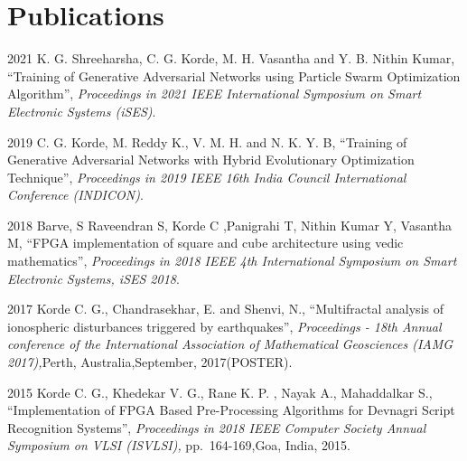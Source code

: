 \documentclass[fontsize=11pt]{tccv}
\begin{document}
\section{Publications}

\begin{publi}
\item{2021} {K. G. Shreeharsha, C. G. Korde, M. H. Vasantha and Y. B. Nithin Kumar, \textquotedblleft Training of Generative Adversarial Networks using Particle Swarm Optimization Algorithm\textquotedblright, \textit{Proceedings in 2021 IEEE International Symposium on Smart Electronic Systems (iSES)}.\qquad }
\vspace{1em}

\item{2019} {C. G. Korde, M. Reddy K., V. M. H. and N. K. Y. B, \textquotedblleft Training of Generative Adversarial Networks with Hybrid Evolutionary Optimization Technique\textquotedblright, \textit{Proceedings in 2019 IEEE 16th India Council International Conference (INDICON)}.\qquad }
\item{2018} {Barve, S Raveendran S, Korde C ,Panigrahi T, Nithin Kumar Y, Vasantha M,  \textquotedblleft FPGA implementation of square and cube architecture using vedic mathematics\textquotedblright, \textit{Proceedings in 2018 IEEE 4th International Symposium on Smart Electronic Systems, iSES 2018}.\qquad }
\vspace{1em}

\item{2017} {  Korde C. G., Chandrasekhar, E. and Shenvi, N., \textquotedblleft Multifractal analysis of ionospheric disturbances triggered by earthquakes\textquotedblright, \textit{Proceedings - 18th Annual conference of the International Association of Mathematical Geosciences (IAMG 2017),}Perth, Australia,September, 2017(POSTER).\qquad }
\vspace{1em}

\item{2015} {Korde C. G., Khedekar V. G., Rane K. P. , Nayak A., Mahaddalkar S., \textquotedblleft Implementation of FPGA Based Pre-Processing Algorithms for Devnagri Script Recognition Systems\textquotedblright, \textit{Proceedings in 2018 IEEE Computer Society Annual Symposium on VLSI (ISVLSI),} pp.~164-169,Goa, India, 2015.\qquad }
\end{publi}
\vspace{1em}
\end{document}
